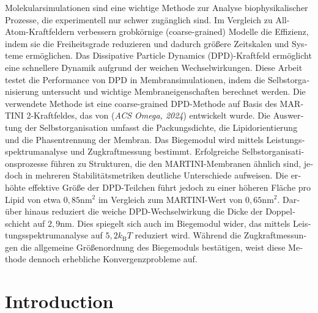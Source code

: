 \documentclass[
    11pt,
    a4paper,
    oneside,        %
    BCOR=10mm,      %
    parskip=half,   %
    listof=nototoc,   %
    bibliography=totoc %
]{scrreprt}
\begin{document}
\foreignlanguage{ngerman}{
Molekularsimulationen sind eine wichtige Methode zur Analyse biophysikalischer Prozesse, die experimentell nur schwer zugänglich sind. Im Vergleich zu All-Atom-Kraftfeldern verbessern grobkörnige (coarse-grained) Modelle die Effizienz, indem sie die Freiheitsgrade reduzieren und dadurch größere Zeitskalen und Systeme ermöglichen. Das Dissipative Particle Dynamics (DPD)-Kraftfeld ermöglicht eine schnellere Dynamik aufgrund der weichen Wechselwirkungen. Diese Arbeit testet die Performance von DPD in Membransimulationen, indem die Selbstorganisierung untersucht und wichtige Membraneigenschaften berechnet werden. Die verwendete Methode ist eine coarse-grained DPD-Methode auf Basis des MARTINI 2-Kraftfeldes, das von \citeauthor{Wang2024} (\textit{ACS Omega, 2024}) entwickelt wurde. Die Auswertung der Selbstorganisation umfasst die Packungsdichte, die Lipidorientierung und die Phasentrennung der Membran. Das Biegemodul wird mittels Leistungsspektrumanalyse und Zugkraftmessung bestimmt. Erfolgreiche Selbstorganisationsprozesse führen zu Strukturen, die den MARTINI-Membranen ähnlich sind, jedoch in mehreren Stabilitätsmetriken deutliche Unterschiede aufweisen. Die erhöhte effektive Größe der DPD-Teilchen führt jedoch zu einer höheren Fläche pro Lipid von etwa $0,85 \si{\nano\m\squared}$ im Vergleich zum MARTINI-Wert von $0,65 \si{\nano\m\squared}$. Darüber hinaus reduziert die weiche DPD-Wechselwirkung die Dicke der Doppelschicht auf $2,9 \si{\nano\m}$. Dies spiegelt sich auch im Biegemodul wider, das mittels Leistungsspektrumanalyse auf $5,2 k_\text{B}T$ reduziert wird. Während die Zugkraftmessungen die allgemeine Größenordnung des Biegemoduls bestätigen, weist diese Methode dennoch erhebliche Konvergenzprobleme auf. 
}


\tableofcontents

\listoffigures

\clearpage

\pagestyle{scrheadings}

\chapter{Introduction}
\end{document}
